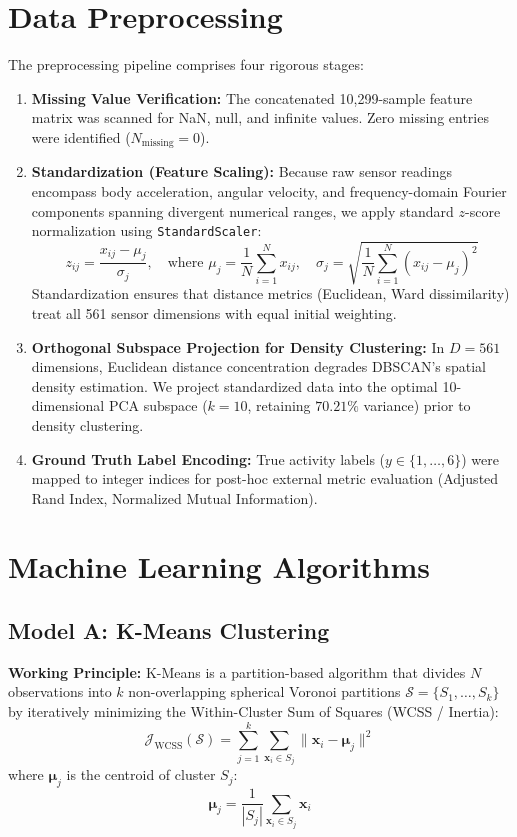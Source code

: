 \documentclass[12pt,a4paper]{article}
\begin{document}
\section{Data Preprocessing}
The preprocessing pipeline comprises four rigorous stages:
\begin{enumerate}[noitemsep]
    \item \textbf{Missing Value Verification:} The concatenated 10,299-sample feature matrix was scanned for NaN, null, and infinite values. Zero missing entries were identified ($N_{\text{missing}} = 0$).
    \item \textbf{Standardization (Feature Scaling):} Because raw sensor readings encompass body acceleration, angular velocity, and frequency-domain Fourier components spanning divergent numerical ranges, we apply standard $z$-score normalization using \texttt{StandardScaler}:
    \begin{equation}
    z_{ij} = \frac{x_{ij} - \mu_j}{\sigma_j}, \quad \text{where } \mu_j = \frac{1}{N}\sum_{i=1}^N x_{ij}, \quad \sigma_j = \sqrt{\frac{1}{N}\sum_{i=1}^N (x_{ij} - \mu_j)^2}
    \end{equation}
    Standardization ensures that distance metrics (Euclidean, Ward dissimilarity) treat all 561 sensor dimensions with equal initial weighting.
    \item \textbf{Orthogonal Subspace Projection for Density Clustering:} In $D = 561$ dimensions, Euclidean distance concentration degrades DBSCAN's spatial density estimation. We project standardized data into the optimal 10-dimensional PCA subspace ($k=10$, retaining $70.21\%$ variance) prior to density clustering.
    \item \textbf{Ground Truth Label Encoding:} True activity labels ($y \in \{1, \dots, 6\}$) were mapped to integer indices for post-hoc external metric evaluation (Adjusted Rand Index, Normalized Mutual Information).
\end{enumerate}

\section{Machine Learning Algorithms}

\subsection{Model A: K-Means Clustering}
\textbf{Working Principle:} K-Means is a partition-based algorithm that divides $N$ observations into $k$ non-overlapping spherical Voronoi partitions $\mathcal{S} = \{S_1, \dots, S_k\}$ by iteratively minimizing the Within-Cluster Sum of Squares (WCSS / Inertia):
\begin{equation}
\mathcal{J}_{\text{WCSS}}(\mathcal{S}) = \sum_{j=1}^k \sum_{\mathbf{x}_i \in S_j} \|\mathbf{x}_i - \boldsymbol{\mu}_j\|^2
\end{equation}
where $\boldsymbol{\mu}_j$ is the centroid of cluster $S_j$:
\begin{equation}
\boldsymbol{\mu}_j = \frac{1}{|S_j|} \sum_{\mathbf{x}_i \in S_j} \mathbf{x}_i
\end{equation}
\end{document}
